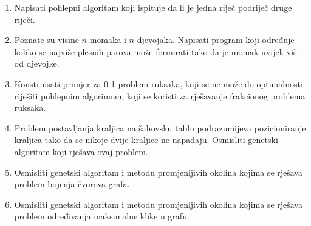\documentclass[a4paper, utf8, 11pt, colorlinks]{book}
\theoremstyle{definition}
\begin{document}
\begin{enumerate}
	\item  Napisati pohlepni algoritam koji ispituje da li je jedna riječ podriječ druge riječi.
	
	\item Poznate su visine $n$ momaka i $n$ djevojaka. Napisati program koji
	određuje koliko se najviše plesnih parova može formirati tako da je momak uvijek
	viši od djevojke.
	\item Konstruisati primjer za 0-1 problem ruksaka, koji se ne može do optimalnosti riješiti pohlepnim algorimom, koji se koristi za rješavanje frakcionog problema ruksaka.
	
	
	\item Problem postavljanja kraljica na šahovsku tablu podrazumijeva pozicioniranje kraljica tako da se nikoje dvije kraljice ne napadaju. Osmisliti genetski algoritam koji rješava ovaj problem.
	\item Osmisliti genetski algoritam i metodu promjenljivih okolina kojima se rješava problem bojenja čvorova grafa.
	
	\item Osmisliti genetski algoritam i metodu promjenljivih okolina kojima se rješava problem određivanja maksimalne klike u grafu.
	

\end{enumerate}
\end{document}
